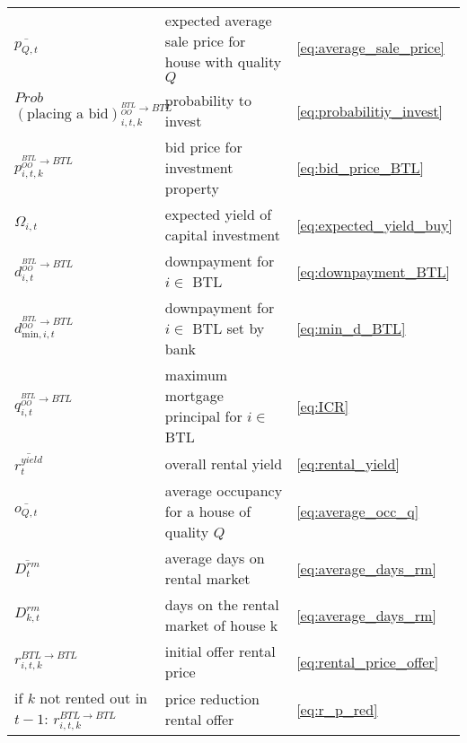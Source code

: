 \documentclass[]{article}
\begin{document}
\begin{longtable}{p{4cm} p{7cm}p{1cm}}
	
	$\overline{p_{Q, t}}$&expected average sale price for house with quality $Q$&\eqref{eq:average_sale_price}\\
	
	$Prob$ $(\text{placing a bid})^{^{BTL}_{OO} \rightarrow BTL}_{i,t,k}$& probability to invest&\eqref{eq:probabilitiy_invest}\\
	
	$p^{^{BTL}_{OO} \rightarrow BTL}_{i,t,k}$&bid price for investment property&\eqref{eq:bid_price_BTL}\\
	
	$\Omega_{i,t}$& expected yield of capital investment& \eqref{eq:expected_yield_buy}\\
	 
	$d^{^{BTL}_{OO}\rightarrow BTL}_{i,t}$&downpayment for $i \in$ BTL&\eqref{eq:downpayment_BTL}\\
	
	$d^{^{BTL}_{OO}\rightarrow BTL}_{\text{min},i,t}$&downpayment for $i \in$ BTL set by bank&\eqref{eq:min_d_BTL}\\
	
	$q^{^{BTL}_{OO}\rightarrow BTL}_{i,t}$&maximum mortgage principal for $i \in$ BTL & \eqref{eq:ICR}\\
	
	
	$\overline{r^{yield}_{t}}$& overall rental yield&\eqref{eq:rental_yield}\\
	
	$\overline{o_{Q, t}}$&average occupancy for a house of quality $Q$& \eqref{eq:average_occ_q}\\
	
	$\overline{D^{rm}_{t}}$&average days on rental market&\eqref{eq:average_days_rm}\\

	$D^{rm}_{k,t}$ &{days on the rental market of house }k &\eqref{eq:average_days_rm}\\
	
	$r^{BTL \rightarrow BTL}_{i,t,k}$&initial offer rental price&\eqref{eq:rental_price_offer}\\
	
	if $k$ not rented out in $t-1$: $r^{BTL \rightarrow BTL}_{i,t,k}$&price reduction rental offer& \eqref{eq:r_p_red}\\
	

\end{longtable}
\end{document}
